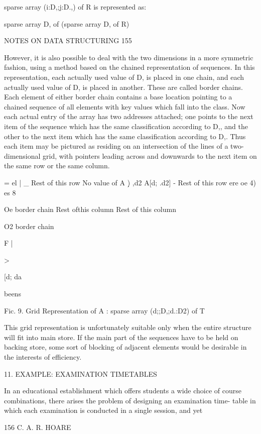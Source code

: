 {{		sparse array (i:D,;j:D.,) of R is represented as:
		
		sparse array D, of (sparse array D, of R)
		
		NOTES ON DATA STRUCTURING 155
		
		However, it is also possible to deal with the two dimensions in a more symmetric fashion, using a method based on the chained representation of sequences. In this representation, each actually used value of D, is placed in one chain, and each actually used value of D, is placed in another. These are called border chains. Each element of either border chain contains a base location pointing to a chained sequence of all elements with key values which fall into the class. Now each actual entry of the array has two addresses attached; one points to the next item of the sequence which has the same classification according to D,, and the other to the next item which has the same classification according to D,. Thus each item may be pictured as residing on an intersection of the lines of a two-dimensional grid, with pointers leading across and downwards to the next item on the same row or the same column.
		
		= el | _ Rest of this row No value of A \d) ,d2 A[d; .d2] - Rest of this row ere oe 4) es 8
		
		Oe border chain Rest ofthis column Rest of this column
		
		O2 border chain
		
		
		
		F |
		
		>
		
		
		[d; da
		
		beens
		
		
		Fic. 9. Grid Representation of A : sparse array (d;;D,;d.:D2) of T
		
		This grid representation is unfortunately suitable only when the entire structure will fit into main store. If the main part of the sequences have to be held on backing store, some sort of blocking of adjacent elements would be desirable in the interests of efficiency.
		
		11. EXAMPLE: EXAMINATION TIMETABLES
		
		In an educational establishment which offers students a wide choice of course combinations, there arises the problem of designing an examination time- table in which each examination is conducted in a single session, and yet
		
		156 C. A. R. HOARE
		
}}
